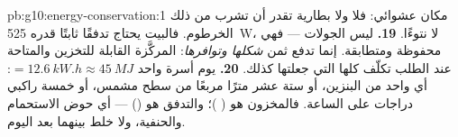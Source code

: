 \begin{solution}{pb:g10:energy-conservation:1}
مكان عشوائي: فلا  ولا بطارية تقدر أن تشرب من ذلك الخرطوم.
فالبيت يحتاج تدفقًا ثابتًا قدره \qty{525}{W}، لا نتوءًا.
\textbf{19.} ليس الجولات --- فهي محفوظة ومتطابقة. إنما تدفع
ثمن \emph{شكلها وتوافرها}: 
المركَّزة القابلة للتخزين والمتاحة عند الطلب تكلّف 
كلها التي جعلتها كذلك.
\textbf{20.} يوم أسرة واحد $= \qty{12.6}{kW.h} \approx
\qty{45}{MJ}$: أي  واحد من البنزين، أو ستة عشر مترًا مربعًا من
سطح مشمس، أو خمسة راكبي دراجات على  الساعة. فالمخزون هو 
( )؛ والتدفق هو  () --- أي حوض الاستحمام
والحنفية، ولا خلط بينهما بعد اليوم.
\end{solution}
